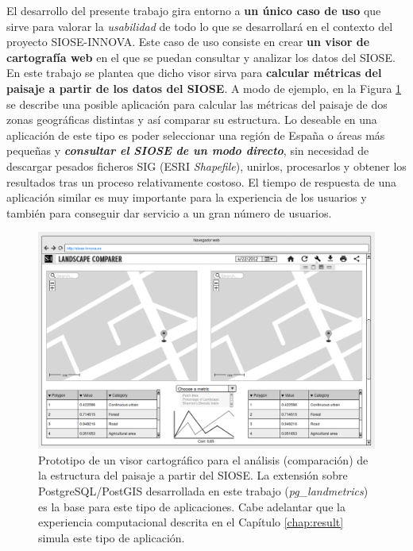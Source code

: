 \begin{prologo}
El desarrollo del presente trabajo gira entorno a \textbf{un único caso de uso} que sirve para valorar la \textit{usabilidad} de todo lo que se desarrollará en el contexto del proyecto SIOSE-INNOVA. Este caso de uso consiste en crear \textbf{un visor de cartografía web} en el que se puedan consultar y analizar los datos del SIOSE. En este trabajo se plantea que dicho visor sirva para \textbf{calcular métricas del paisaje a partir de los datos del SIOSE}. A modo de ejemplo, en la Figura \ref{fig:visorweb} se describe una posible aplicación para calcular las métricas del paisaje de dos zonas geográficas distintas y así comparar su estructura. Lo deseable en una aplicación de este tipo es poder seleccionar una región de España o áreas más pequeñas y \textbf{\textit{consultar el SIOSE de un modo directo}}, sin necesidad de descargar pesados ficheros SIG (ESRI \textit{Shapefile}), unirlos, procesarlos y obtener los resultados tras un proceso relativamente costoso. El tiempo de respuesta de una aplicación similar es muy importante para la experiencia de los usuarios y también para conseguir dar servicio a un gran número de usuarios.

\begin{figure}
\begin{center}
\includegraphics[width=\textwidth]{Prologo/Figs/visorweb.png}
\caption{Prototipo de un visor cartográfico para el análisis (comparación) de la estructura del paisaje a partir del SIOSE. La extensión sobre PostgreSQL/PostGIS desarrollada en este trabajo (\textit{pg\_landmetrics}) es la base para este tipo de aplicaciones. Cabe adelantar que la experiencia computacional descrita en el Capítulo \ref{chap:result} simula este tipo de aplicación. \label{fig:visorweb}}
\end{center}
\end{figure}


\end{prologo}
